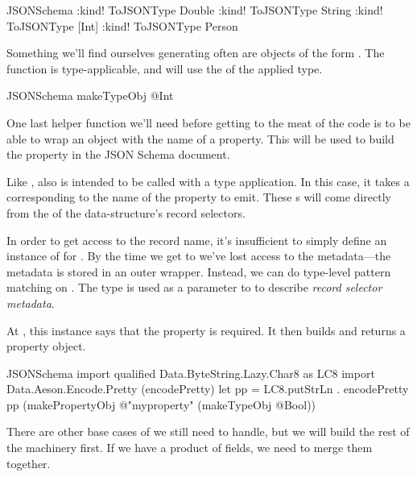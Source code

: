 \documentclass[book.tex]{subfiles}
\begin{document}

\begin{dorepl}{JSONSchema}
:kind! ToJSONType Double
:kind! ToJSONType String
:kind! ToJSONType [Int]
:kind! ToJSONType Person
\end{dorepl}

Something we'll find ourselves generating often are objects of the form
. The function  is type-applicable, and
will use the  of the applied type.


\begin{dorepl}{JSONSchema}
makeTypeObj @Int
\end{dorepl}

One last helper function we'll need before getting to the meat of the
 code is to be able to wrap an object with the name of a
property. This will be used to build the  property in the
JSON Schema document.


Like ,  also is intended to be called with a
type application. In this case, it takes a  corresponding to the
name of the property to emit. These s will come directly from the
 of the data-structure's record selectors.

In order to get access to the record name, it's insufficient to simply define an
instance of  for . By the time we get to  we've lost
access to the metadata---the metadata is stored in an outer wrapper.  Instead,
we can do type-level pattern matching on . The 
type is used as a parameter to  to describe \emph{record selector
metadata}.


At , this instance says that the property  is required. It then
builds and returns a property object.

\begin{dorepl}{JSONSchema}
import qualified Data.ByteString.Lazy.Char8 as LC8
import Data.Aeson.Encode.Pretty (encodePretty)
let pp = LC8.putStrLn . encodePretty
pp (makePropertyObj @"myproperty" (makeTypeObj @Bool))
\end{dorepl}

There are other base cases of  we still need to handle, but we will
build the rest of the machinery first. If we have a product of fields, we need
to merge them together.
\end{document}
